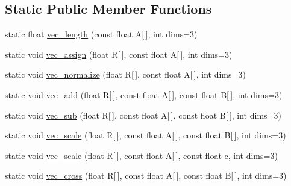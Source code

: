\subsection*{Static Public Member Functions}
\begin{DoxyCompactItemize}
\item 
static float \mbox{\hyperlink{classWorld_ab14c775fe092d0e2fc89bcaa5fe0a165}{vec\+\_\+length}} (const float A\mbox{[}$\,$\mbox{]}, int dims=3)
\item 
static void \mbox{\hyperlink{classWorld_a932702308039cbf8d98f69ffbb3748f9}{vec\+\_\+assign}} (float R\mbox{[}$\,$\mbox{]}, const float A\mbox{[}$\,$\mbox{]}, int dims=3)
\item 
static void \mbox{\hyperlink{classWorld_af1d0bfb9010d194010fb6abc505d40cf}{vec\+\_\+normalize}} (float R\mbox{[}$\,$\mbox{]}, const float A\mbox{[}$\,$\mbox{]}, int dims=3)
\item 
static void \mbox{\hyperlink{classWorld_adcfaf0158333d4f398eabd94e033de37}{vec\+\_\+add}} (float R\mbox{[}$\,$\mbox{]}, const float A\mbox{[}$\,$\mbox{]}, const float B\mbox{[}$\,$\mbox{]}, int dims=3)
\item 
static void \mbox{\hyperlink{classWorld_aae347e6c500ccb406b5344c0e02c4c83}{vec\+\_\+sub}} (float R\mbox{[}$\,$\mbox{]}, const float A\mbox{[}$\,$\mbox{]}, const float B\mbox{[}$\,$\mbox{]}, int dims=3)
\item 
static void \mbox{\hyperlink{classWorld_a70a8d815c805c5e20d5374384ae3d5c2}{vec\+\_\+scale}} (float R\mbox{[}$\,$\mbox{]}, const float A\mbox{[}$\,$\mbox{]}, const float B\mbox{[}$\,$\mbox{]}, int dims=3)
\item 
static void \mbox{\hyperlink{classWorld_ab78807c00ae11c6ddf732a2d1b5ab89d}{vec\+\_\+scale}} (float R\mbox{[}$\,$\mbox{]}, const float A\mbox{[}$\,$\mbox{]}, const float c, int dims=3)
\item 
static void \mbox{\hyperlink{classWorld_a9b029d34daf647dee298b726de427f94}{vec\+\_\+cross}} (float R\mbox{[}$\,$\mbox{]}, const float A\mbox{[}$\,$\mbox{]}, const float B\mbox{[}$\,$\mbox{]}, int dims=3)
\end{DoxyCompactItemize}
